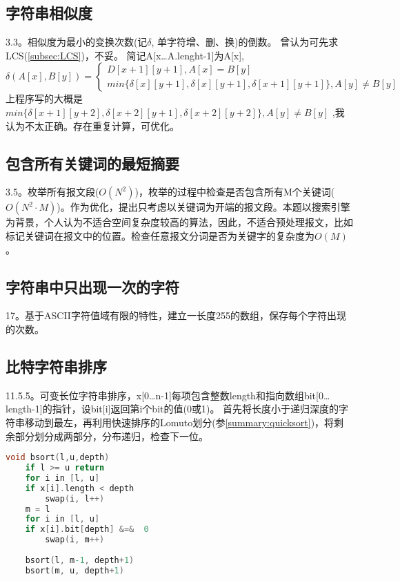 \subsection{字符串相似度}
\cite{bop}3.3。相似度为最小的变换次数(记$\delta$, 单字符增、删、换)的倒数。
曾认为可先求LCS(\ref{subsec:LCS})，不妥。 简记A[x\ldots A.lenght-1]为A[x], 
\begin{displaymath}
   \delta(A[x], B[y])=
   \left\{
   \begin{array}{l}
       D[x+1][y+1], A[x]=B[y] \\ 
       min\{\delta[x][y+1], \delta[x][y+1], \delta[x+1][y+1] \}, A[y] \ne B[y]
   \end{array} 
    \right.
\end{displaymath}
\cite{bop}上程序写的大概是
\begin{math}
       min\{\delta[x+1][y+2], \delta[x+2][y+1], \delta[x+2][y+2] \}, A[y] \ne B[y]
\end{math}
,我认为不太正确。存在重复计算，可优化。

\subsection{包含所有关键词的最短摘要}
\cite{bop}3.5。枚举所有报文段($O(N^2)$)，枚举的过程中检查是否包含所有M个关键词($O(N^{2} \cdot M)$)。作为优化，\cite{bop}提出只考虑以关键词为开端的报文段。本题以搜索引擎为背景，个人认为不适合空间复杂度较高的算法，因此，不适合预处理报文，比如标记关键词在报文中的位置。检查任意报文分词是否为关键字的复杂度为$O(M)$。


\subsection{字符串中只出现一次的字符}
\cite{ms100}17。基于ASCII字符值域有限的特性，建立一长度255的数组，保存每个字符出现的次数。


\subsection{比特字符串排序}
\cite{pp}11.5.5。可变长位字符串排序，x[0\ldots n-1]每项包含整数length和指向数组bit[0\dots length-1]的指针，设bit[i]返回第i个bit的值(0或1)。 首先将长度小于递归深度的字符串移动到最左，再利用快速排序的Lomuto划分(参\ref{summary:quicksort})，将剩余部分划分成两部分，分布递归，检查下一位。

\begin{lstlisting}[language=C]
void bsort(l,u,depth)
    if l >= u return
    for i in [l, u]
	if x[i].length < depth
	    swap(i, l++)
    m = l
    for i in [l, u]
	if x[i].bit[depth] &=&  0
	    swap(i, m++)
    
    bsort(l, m-1, depth+1)
    bsort(m, u, depth+1)
\end{lstlisting}

